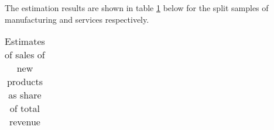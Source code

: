 \label{sec:results}
The estimation results are shown in table \ref{tab:estimates} below for the split samples of manufacturing and services respectively.
\begin{table}[H]
  \vspace{-0.8cm}
  \centering
  \caption{Estimates of sales of new products as share of total revenue}
  \footnotesize
    \begin{tabular}{lcccc}
    \toprule
        
    \end{tabular}
    \\ 
  \label{tab:estimates}
\end{table}
